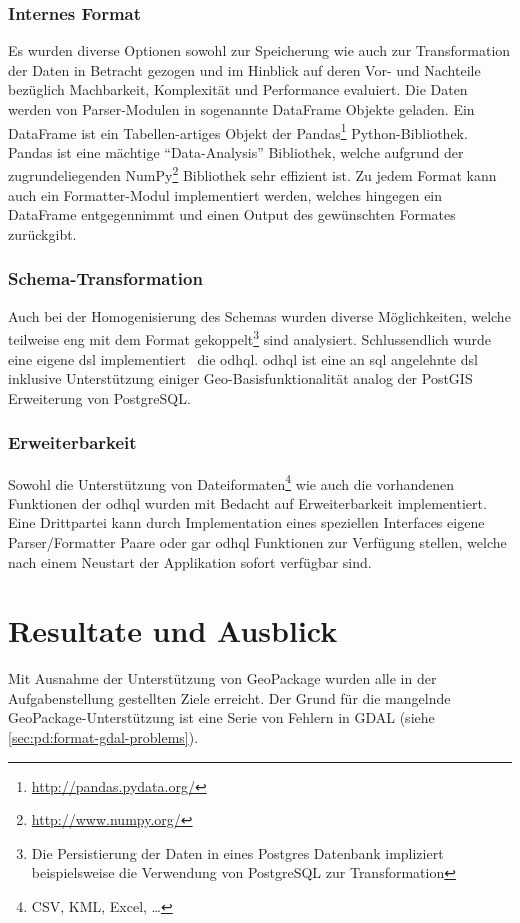 \subsection{Internes Format}
Es wurden diverse Optionen sowohl zur Speicherung wie auch zur Transformation der Daten in Betracht gezogen und im Hinblick auf deren Vor- und Nachteile bezüglich Machbarkeit, Komplexität und Performance evaluiert. Die Daten werden von Parser-Modulen in sogenannte DataFrame Objekte geladen. Ein DataFrame ist ein Tabellen-artiges Objekt der Pandas\footnote{\url{http://pandas.pydata.org/}} Python-Bibliothek. Pandas ist eine mächtige ``Data-Analysis'' Bibliothek, welche aufgrund der zugrundeliegenden NumPy\footnote{\url{http://www.numpy.org/}} Bibliothek sehr effizient ist.
Zu jedem Format kann auch ein Formatter-Modul implementiert werden, welches hingegen ein DataFrame entgegennimmt und einen Output des gewünschten Formates zurückgibt.

\subsection{Schema-Transformation}
Auch bei der Homogenisierung des Schemas wurden diverse Möglichkeiten, welche teilweise eng mit dem Format gekoppelt\footnote{Die Persistierung der Daten in eines Postgres Datenbank impliziert beispielsweise die Verwendung von PostgreSQL zur Transformation} sind analysiert. Schlussendlich wurde eine eigene \gls{dsl} implementiert \textendash\ die \acf{odhql}. \acs{odhql} ist eine an \acs{sql} angelehnte \gls{dsl} inklusive Unterstützung einiger Geo-Basisfunktionalität analog der PostGIS Erweiterung von PostgreSQL.

\subsection{Erweiterbarkeit}
Sowohl die Unterstützung von Dateiformaten\footnote{CSV, KML, Excel, \dots} wie auch die vorhandenen Funktionen der \acf{odhql} wurden mit Bedacht auf Erweiterbarkeit implementiert. Eine Drittpartei kann durch Implementation eines speziellen Interfaces eigene Parser/Formatter Paare oder gar \gls{odhql} Funktionen zur Verfügung stellen, welche nach einem Neustart der Applikation sofort verfügbar sind.


\chapter{Resultate und Ausblick} \label{sec:tb:results}
Mit Ausnahme der Unterstützung von GeoPackage wurden alle in der Aufgabenstellung gestellten Ziele erreicht. Der Grund für die mangelnde GeoPackage-Unterstützung ist eine Serie von Fehlern in GDAL (siehe \cref{sec:pd:format-gdal-problems}).

